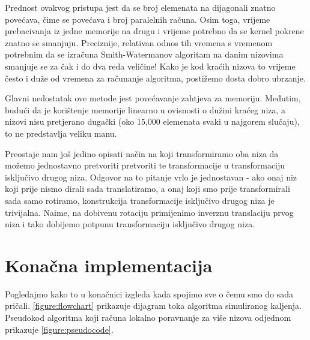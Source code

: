 \documentclass[times, utf8, zavrsni]{fer}
\begin{document}
Prednost ovakvog pristupa jest da se broj elemenata na dijagonali 
znatno povećava, čime se povećava i broj paralelnih računa.
Osim toga, vrijeme prebacivanja iz jedne memorije na drugu
i vrijeme potrebno da se kernel pokrene znatno se smanjuju.
Preciznije, relativan odnos tih vremena s vremenom potrebnim
da se izračuna Smith-Watermanov algoritam na danim nizovima 
smanjuje se za čak i do dva reda veličine! Kako je
kod kraćih nizova to vrijeme često i duže od vremena za računanje
algoritma, postižemo dosta dobro ubrzanje. 

Glavni nedostatak ove metode jest povećavanje zahtjeva za memoriju.
Međutim, budući da je korištenje memorije linearno u ovisnosti o
dužini kraćeg niza, a nizovi nisu pretjerano dugački (oko 15,000
elemenata svaki u najgorem slučaju), to ne predstavlja veliku
manu. 

Preostaje nam još jedino opisati način na koji transformiramo
oba niza da možemo jednostavno pretvoriti pretvoriti te transformacije
u transformaciju isključivo drugog niza. Odgovor na to pitanje
vrlo je jednostavan - ako onaj niz koji prije nismo dirali sada
translatiramo, a onaj koji smo prije transformirali sada samo
rotiramo, konstrukcija transformacije isključivo drugog niza
je trivijalna. Naime, na dobivenu rotaciju primijenimo inverznu
translaciju prvog niza i tako dobijemo potpunu transformaciju
isključivo drugog niza.

\section{Konačna implementacija}

Pogledajmo kako to u konačnici izgleda kada spojimo sve o čemu smo
do sada pričali. \autoref{figure:flowchart} prikazuje dijagram toka
algoritma simuliranog kaljenja. Pseudokod algoritma koji računa
lokalno poravnanje za više nizova odjednom prikazuje
\autoref{figure:pseudocode}.
\end{document}
